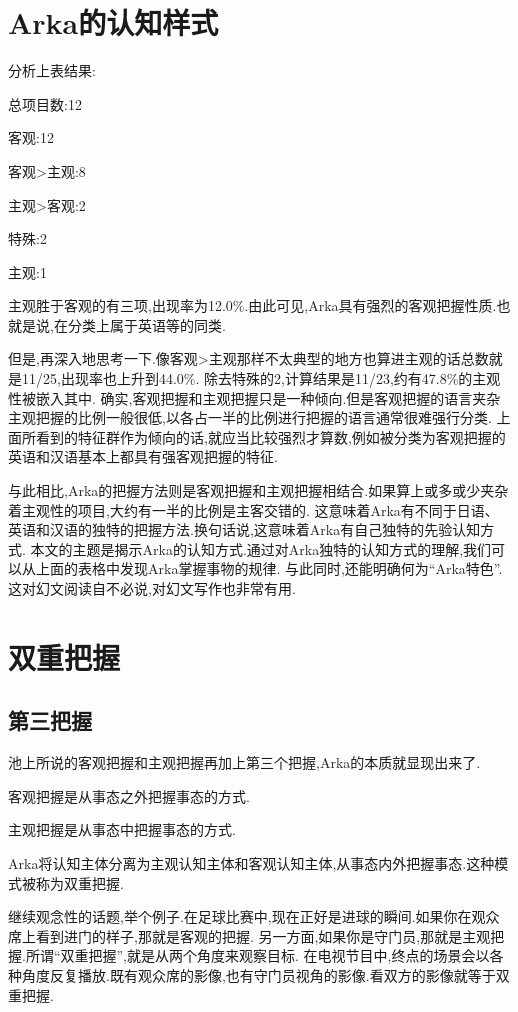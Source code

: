\section{Arka的认知样式}

分析上表结果:

总项目数:12

客观:12

客观>主观:8

主观>客观:2

特殊:2

主观:1

主观胜于客观的有三项,出现率为12.0\%.由此可见,Arka具有强烈的客观把握性质.也就是说,在分类上属于英语等的同类.

但是,再深入地思考一下.像客观>主观那样不太典型的地方也算进主观的话总数就是11/25,出现率也上升到44.0\%.
除去特殊的2,计算结果是11/23,约有47.8\%的主观性被嵌入其中.
确实,客观把握和主观把握只是一种倾向.但是客观把握的语言夹杂主观把握的比例一般很低,以各占一半的比例进行把握的语言通常很难强行分类.
上面所看到的特征群作为倾向的话,就应当比较强烈才算数,例如被分类为客观把握的英语和汉语基本上都具有强客观把握的特征.

与此相比,Arka的把握方法则是客观把握和主观把握相结合.如果算上或多或少夹杂着主观性的项目,大约有一半的比例是主客交错的.
这意味着Arka有不同于日语、英语和汉语的独特的把握方法.换句话说,这意味着Arka有自己独特的先验认知方式.
本文的主题是揭示Arka的认知方式.通过对Arka独特的认知方式的理解,我们可以从上面的表格中发现Arka掌握事物的规律.
与此同时,还能明确何为``Arka特色''.这对幻文阅读自不必说,对幻文写作也非常有用.


\section{双重把握}
\subsection{第三把握}
池上所说的客观把握和主观把握再加上第三个把握,Arka的本质就显现出来了.

客观把握是从事态之外把握事态的方式.

主观把握是从事态中把握事态的方式.

Arka将认知主体分离为主观认知主体和客观认知主体,从事态内外把握事态.这种模式被称为双重把握.

继续观念性的话题,举个例子.在足球比赛中,现在正好是进球的瞬间.如果你在观众席上看到进门的样子,那就是客观的把握.
另一方面,如果你是守门员,那就是主观把握.所谓``双重把握'',就是从两个角度来观察目标.
在电视节目中,终点的场景会以各种角度反复播放.既有观众席的影像,也有守门员视角的影像.看双方的影像就等于双重把握.

